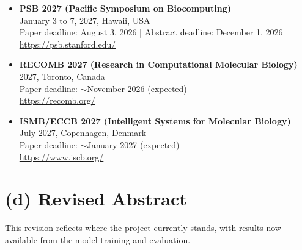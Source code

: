 \documentclass[12pt,a4paper]{article}
\begin{document}
\begin{itemize}

    \item \textbf{PSB 2027 (Pacific Symposium on Biocomputing)}\\
    January 3 to 7, 2027, Hawaii, USA\\
    Paper deadline: August 3, 2026 | Abstract deadline: December 1, 2026\\
    \url{https://psb.stanford.edu/}

    \vspace{0.5em}
    \item \textbf{RECOMB 2027 (Research in Computational Molecular Biology)}\\
    2027, Toronto, Canada\\
    Paper deadline: $\sim$November 2026 (expected)\\
    \url{https://recomb.org/}

    \vspace{0.5em}
    \item \textbf{ISMB/ECCB 2027 (Intelligent Systems for Molecular Biology)}\\
    July 2027, Copenhagen, Denmark\\
    Paper deadline: $\sim$January 2027 (expected)\\
    \url{https://www.iscb.org/}

\end{itemize}

\newpage

\section*{(d) Revised Abstract}

This revision reflects where the project currently stands, with results now available from the model training and evaluation.
\end{document}
